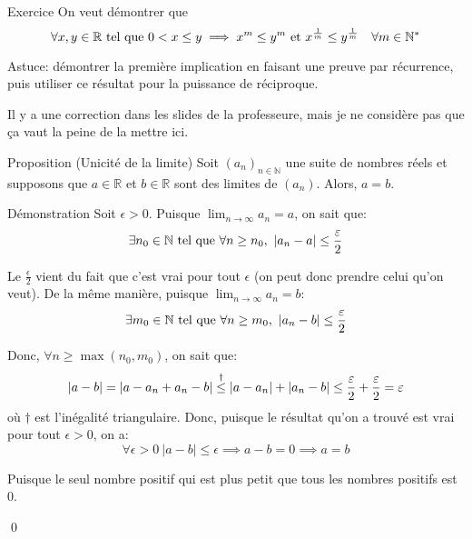 \documentclass[a4paper]{article}
\begin{document}
\begin{parag}{Exercice}
    On veut démontrer que 
    \[\forall x, y \in \mathbb{R} \text{ tel que } 0 < x \leq y \implies x^m \leq y^m \text{ et } x^{\frac{1}{m}} \leq y^{\frac{1}{m}} \quad \forall m \in \mathbb{N}^*\]
    
    Astuce: démontrer la première implication en faisant une preuve par récurrence, puis utiliser ce résultat pour la puissance de réciproque.

    Il y a une correction dans les slides de la professeure, mais je ne considère pas que ça vaut la peine de la mettre ici.
\end{parag}

\begin{parag}{Proposition (Unicité de la limite)}
    Soit $\left(a_n\right)_{n\in\mathbb{N}}$ une suite de nombres réels et supposons que $a \in \mathbb{R}$ et $b \in \mathbb{R}$ sont des limites de $\left(a_n\right)$. Alors, $a = b$. 

    \begin{subparag}{Démonstration}
        Soit $\epsilon > 0$. Puisque $\lim_{n \to \infty} a_n = a$, on sait que:
        \[\exists n_0 \in \mathbb{N} \telque \forall n \geq n_0, \ \left|a_n - a\right|\leq \frac{\epsilon}{2}\]
        
        Le $\frac{\epsilon}{2}$ vient du fait que c'est vrai pour tout $\epsilon$ (on peut donc prendre celui qu'on veut). De la même manière, puisque $\lim_{n \to \infty} a_n = b$: 
        \[\exists m_0 \in \mathbb{N} \telque \forall n \geq m_0, \ \left|a_n - b\right| \leq \frac{\epsilon}{2}\]

        Donc, $\forall n \geq \max\left(n_0, m_0\right)$, on sait que: 
        \[\left|a - b\right| = \left|a - a_n + a_n - b\right| \over{\leq}{$\dagger$} \left|a - a_n\right| + \left|a_n - b\right| \leq \frac{\epsilon}{2} + \frac{\epsilon}{2} = \epsilon \]
        où $\dagger$ est l'inégalité triangulaire. Donc, puisque le résultat qu'on a trouvé est vrai pour tout $\epsilon > 0$, on a: 
        \[\forall \epsilon > 0 \ \left|a - b\right| \leq \epsilon \implies a - b = 0 \implies a = b\]

        Puisque le seul nombre positif qui est plus petit que tous les nombres positifs est 0.

        \qed
    \end{subparag}
\end{parag}
\end{document}

